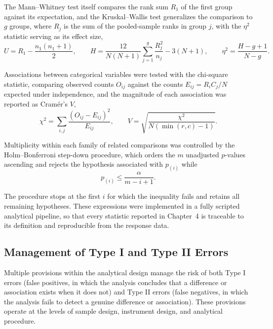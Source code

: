 The Mann--Whitney test itself compares the rank sum $R_1$ of the first group against its expectation, and the Kruskal--Wallis test generalizes the comparison to $g$ groups, where $R_j$ is the sum of the pooled-sample ranks in group $j$, with the $\eta^2$ statistic serving as its effect size,
\begin{equation}
  \label{eqn:u_h_eta}
  U = R_1 - \frac{n_1(n_1+1)}{2},
  \qquad
  H = \frac{12}{N(N+1)}\sum_{j=1}^{g}\frac{R_j^2}{n_j}-3(N+1),
  \qquad
  \eta^2 = \frac{H-g+1}{N-g}.
\end{equation}
Associations between categorical variables were tested with the chi-square statistic, comparing observed counts $O_{ij}$ against the counts $E_{ij}=R_iC_j/N$ expected under independence, and the magnitude of each association was reported as Cram\'er's $V$,
\begin{equation}
  \label{eqn:chi_cramer}
  \chi^2 = \sum_{i,j}\frac{\left(O_{ij}-E_{ij}\right)^2}{E_{ij}},
  \qquad
  V = \sqrt{\frac{\chi^2}{N\left(\min(r,c)-1\right)}}.
\end{equation}
Multiplicity within each family of related comparisons was controlled by the Holm--Bonferroni step-down procedure, which orders the $m$ unadjusted $p$-values ascending and rejects the hypothesis associated with $p_{(i)}$ while
\begin{equation}
  \label{eqn:holm}
  p_{(i)} \le \frac{\alpha}{m-i+1}.
\end{equation}
The procedure stops at the first $i$ for which the inequality fails and retains all remaining hypotheses. These expressions were implemented in a fully scripted analytical pipeline, so that every statistic reported in Chapter~4 is traceable to its definition and reproducible from the response data.

\subsection{Management of Type I and Type II Errors}

Multiple provisions within the analytical design manage the risk of both Type I errors (false positives, in which the analysis concludes that a difference or association exists when it does not) and Type II errors (false negatives, in which the analysis fails to detect a genuine difference or association). These provisions operate at the levels of sample design, instrument design, and analytical procedure.

